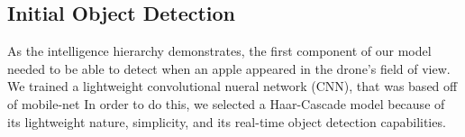 \subsection{Initial Object Detection}
As the intelligence hierarchy demonstrates, the first component of our model needed to be able to detect when an apple appeared in the drone's field of view. 
We trained a lightweight convolutional nueral network (CNN), that was based off of mobile-net 
In order to do this, we selected a Haar-Cascade model because of its lightweight nature, simplicity, and its real-time object detection capabilities. 